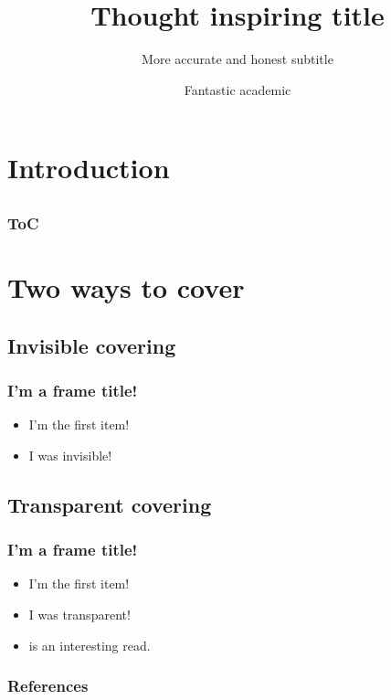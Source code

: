 \documentclass{beamer}
\begin{document}

\title{Thought inspiring title}
\subtitle{More accurate and honest subtitle}  
\author{Fantastic academic}
\section{Introduction}\subsection{}%
\begin{frame}
\titlepage
\end{frame}
\setcounter{framenumber}{0}%

\begin{frame}\frametitle{ToC}
\tableofcontents
\end{frame}

\section{Two ways to cover}\subsection{Invisible covering}
\begin{frame}\frametitle{I'm a frame title!}
\begin{itemize}
\item{I'm the first item!}
\pause
\item{I was invisible!}
\end{itemize}
\end{frame}

\subsection{Transparent covering}
\begin{frame}\frametitle{I'm a frame title!}
\begin{itemize}
\item{I'm the first item!}
\vfill
\pause
\item{I was transparent!}
\vfill
\pause
\item{\cite{songs} is an interesting read.}
\vfill
\end{itemize}
\end{frame}

\begin{frame}[t,allowframebreaks]
\frametitle{References}

\end{frame}
\end{document}
